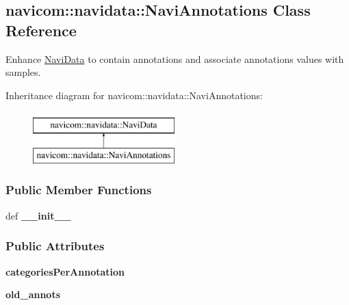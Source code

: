 \hypertarget{classnavicom_1_1navidata_1_1NaviAnnotations}{
\subsection{navicom::navidata::NaviAnnotations Class Reference}
\label{classnavicom_1_1navidata_1_1NaviAnnotations}
}


Enhance \hyperlink{classnavicom_1_1navidata_1_1NaviData}{NaviData} to contain annotations and associate annotations values with samples.  


Inheritance diagram for navicom::navidata::NaviAnnotations:\begin{figure}[H]
\begin{center}
\leavevmode
\includegraphics[height=2.000000cm]{classnavicom_1_1navidata_1_1NaviAnnotations}
\end{center}
\end{figure}
\subsubsection*{Public Member Functions}
\begin{DoxyCompactItemize}
\item 
\hypertarget{classnavicom_1_1navidata_1_1NaviAnnotations_a213947a92d3df83acab69c98df419865}{
def {\bfseries \_\-\_\-init\_\-\_\-}}
\label{classnavicom_1_1navidata_1_1NaviAnnotations_a213947a92d3df83acab69c98df419865}

\end{DoxyCompactItemize}
\subsubsection*{Public Attributes}
\begin{DoxyCompactItemize}
\item 
\hypertarget{classnavicom_1_1navidata_1_1NaviAnnotations_a1c26e115cb2eabe4384cd2fa0c7f776f}{
{\bfseries categoriesPerAnnotation}}
\label{classnavicom_1_1navidata_1_1NaviAnnotations_a1c26e115cb2eabe4384cd2fa0c7f776f}

\item 
\hypertarget{classnavicom_1_1navidata_1_1NaviAnnotations_ab053ca65505c1a9d72e2afb96ddcae9c}{
{\bfseries old\_\-annots}}
\label{classnavicom_1_1navidata_1_1NaviAnnotations_ab053ca65505c1a9d72e2afb96ddcae9c}

\end{DoxyCompactItemize}


